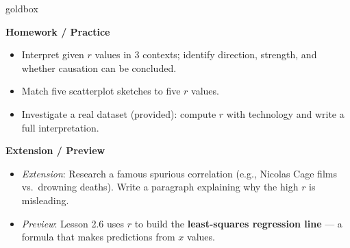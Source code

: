\documentclass[10pt]{article}
\begin{document}
\begin{skillbox}{goldbox}
\begin{minipage}[t]{0.48\linewidth}
    \textbf{Homework / Practice}
    \begin{itemize}
        \item Interpret given $r$ values in 3 contexts; identify direction, strength, and
              whether causation can be concluded.
        \item Match five scatterplot sketches to five $r$ values.
        \item Investigate a real dataset (provided): compute $r$ with technology and write
              a full interpretation.
    \end{itemize}
\end{minipage}
\hfill
\begin{minipage}[t]{0.48\linewidth}
    \textbf{Extension / Preview}
    \begin{itemize}
        \item \textit{Extension}: Research a famous spurious correlation (e.g., Nicolas Cage
              films vs.\ drowning deaths). Write a paragraph explaining why the high $r$ is
              misleading.
        \item \textit{Preview}: Lesson 2.6 uses $r$ to build the \textbf{least-squares
              regression line} --- a formula that makes predictions from $x$ values.
    \end{itemize}
\end{minipage}
\end{skillbox}
\end{document}
